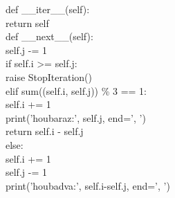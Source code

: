 \documentclass[addpoints,12pt]{exam}
\begin{document}
\begin{questions}
{\hspace*{0.6cm}def \_{}\_{}iter\_{}\_{}(self):\\
\hspace*{0.6cm}\hspace*{0.6cm}return self\\
\hspace*{0.6cm}def \_{}\_{}next\_{}\_{}(self):\\
\hspace*{0.6cm}\hspace*{0.6cm}self.j -= 1\\
\hspace*{0.6cm}\hspace*{0.6cm}if self.i \textgreater{}= self.j:\\
\hspace*{0.6cm}\hspace*{0.6cm}\hspace*{0.6cm}raise StopIteration()\\
\hspace*{0.6cm}\hspace*{0.6cm}elif sum((self.i, self.j)) \%{} 3 == 1:\\
\hspace*{0.6cm}\hspace*{0.6cm}\hspace*{0.6cm}self.i += 1\\
\hspace*{0.6cm}\hspace*{0.6cm}\hspace*{0.6cm}print('houbaraz:', self.j, end=', ')\\
\hspace*{0.6cm}\hspace*{0.6cm}\hspace*{0.6cm}return self.i - self.j\\
\hspace*{0.6cm}\hspace*{0.6cm}else:\\
\hspace*{0.6cm}\hspace*{0.6cm}\hspace*{0.6cm}self.i += 1\\
\hspace*{0.6cm}\hspace*{0.6cm}\hspace*{0.6cm}self.j -= 1\\
\hspace*{0.6cm}\hspace*{0.6cm}\hspace*{0.6cm}print('houbadva:', self.i-self.j, end=', ')\\
}
\end{questions}
\end{document}
